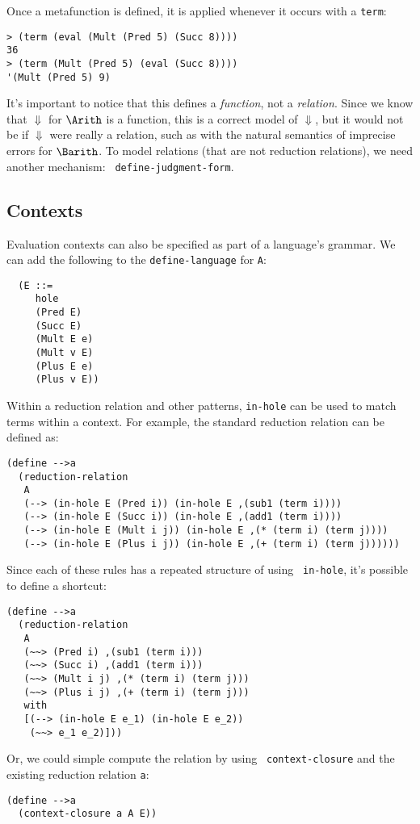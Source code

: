 Once a metafunction is defined, it is applied whenever it occurs with
a {\tt term}:
\begin{verbatim}
> (term (eval (Mult (Pred 5) (Succ 8))))
36
> (term (Mult (Pred 5) (eval (Succ 8))))
'(Mult (Pred 5) 9)
\end{verbatim}

It's important to notice that this defines a \emph{function}, not a
\emph{relation}.  Since we know that $\Downarrow$ for $\Arith$ is a
function, this is a correct model of $\Downarrow$, but it would not be
if $\Downarrow$ were really a relation, such as with the natural
semantics of imprecise errors for $\Barith$.  To model relations (that
are not reduction relations), we need another mechanism: {\tt
  define-judgment-form}.

\subsection{Contexts}

Evaluation contexts can also be specified as part of a language's
grammar.  We can add the following to the {\tt define-language} for
{\tt A}:
\begin{verbatim}
  (E ::=
     hole
     (Pred E)
     (Succ E)
     (Mult E e)
     (Mult v E)
     (Plus E e)
     (Plus v E))
\end{verbatim}

Within a reduction relation and other patterns, {\tt in-hole} can be
used to match terms within a context.  For example, the standard
reduction relation can be defined as:
\begin{verbatim}
(define -->a
  (reduction-relation
   A
   (--> (in-hole E (Pred i)) (in-hole E ,(sub1 (term i))))
   (--> (in-hole E (Succ i)) (in-hole E ,(add1 (term i))))
   (--> (in-hole E (Mult i j)) (in-hole E ,(* (term i) (term j))))
   (--> (in-hole E (Plus i j)) (in-hole E ,(+ (term i) (term j))))))
\end{verbatim}

Since each of these rules has a repeated structure of using {\tt
  in-hole}, it's possible to define a shortcut:
\begin{verbatim}
(define -->a
  (reduction-relation
   A
   (~~> (Pred i) ,(sub1 (term i)))
   (~~> (Succ i) ,(add1 (term i)))
   (~~> (Mult i j) ,(* (term i) (term j)))
   (~~> (Plus i j) ,(+ (term i) (term j)))
   with
   [(--> (in-hole E e_1) (in-hole E e_2))
    (~~> e_1 e_2)]))
\end{verbatim}
Or, we could simple compute the relation by using {\tt
  context-closure} and the existing reduction relation {\tt a}:
\begin{verbatim}
(define -->a
  (context-closure a A E))
\end{verbatim}

